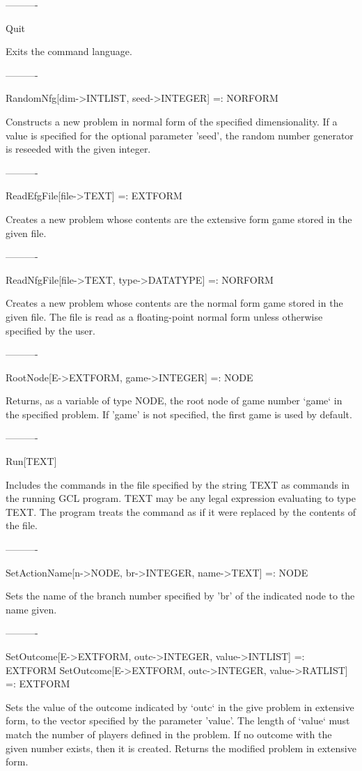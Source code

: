 ----------

Quit

	Exits the command language.

----------

RandomNfg[dim->INTLIST, {seed->INTEGER}] =: NORFORM

	Constructs a new problem in normal form of the specified
dimensionality.  If a value is specified for the optional parameter 'seed',
the random number generator is reseeded with the given integer.

----------

ReadEfgFile[file->TEXT] =: EXTFORM

	Creates a new problem whose contents are the extensive form game
stored in the given file.

----------

ReadNfgFile[file->TEXT, {type->DATATYPE}] =: NORFORM

	Creates a new problem whose contents are the normal form game stored
in the given file.  The file is read as a floating-point normal form unless
otherwise specified by the user.

----------

RootNode[E->EXTFORM, {game->INTEGER}] =: NODE

	Returns, as a variable of type NODE, the root node of game number 
`game` in the specified problem.  If 'game' is not specified, the first game is
used by default.

----------

Run[TEXT]

	Includes the commands in the file specified by the string TEXT as
commands in the running GCL program.  TEXT may be any legal expression
evaluating to type TEXT.  The program treats the command as if it were
replaced by the contents of the file.

----------

SetActionName[n->NODE, br->INTEGER, name->TEXT] =: NODE

	Sets the name of the branch number specified by 'br' of the indicated 
node to the name given.

----------

SetOutcome[E->EXTFORM, outc->INTEGER, value->INTLIST] =: EXTFORM
SetOutcome[E->EXTFORM, outc->INTEGER, value->RATLIST] =: EXTFORM

	Sets the value of the outcome indicated by `outc` in the give problem 
in extensive form, to the vector specified by the parameter 'value'.  The 
length of `value` must match the number of players defined in the problem.  If
no outcome with the given number exists, then it is created.  Returns the 
modified problem in extensive form.


